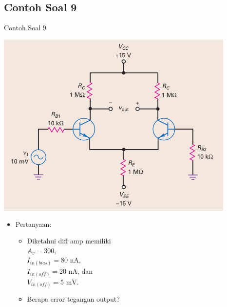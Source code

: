 \documentclass[aspectratio=169]{beamer}
\begin{document}
\subsection{Contoh Soal 9}
\begin{frame}{Contoh Soal 9}
	\begin{multicols}{2}
		\begin{center}
			\includegraphics[height=0.7\textheight]{gambar/01.contoh_soal_9}
		\end{center}
		\columnbreak
		\begin{itemize}
			\item Pertanyaan:
			\begin{itemize}
				\item Diketahui diff amp memiliki\\
				$ A_v = 300 $, \\
				$ I_{in(bias)} = 80 \text{ nA}$, \\
				$ I_{in(off)} = 20 \text{ nA}$, dan \\
				$ V_{in(off)} = 5 \text{ mV}$.
				\item Berapa error tegangan output?
			\end{itemize}
		\end{itemize}
	\end{multicols}
\end{frame}
\end{document}
